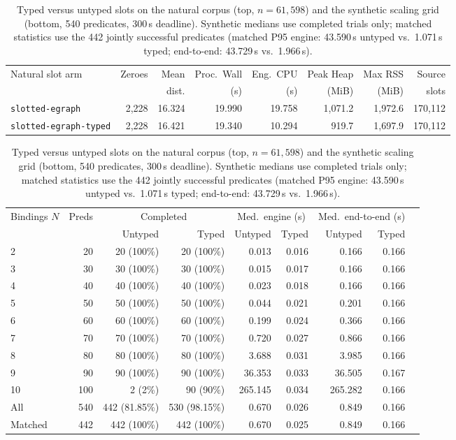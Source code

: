 \begin{table}[H]
\centering
\caption{Typed versus untyped slots on the natural corpus (top, $n=61{,}598$)
and the synthetic scaling grid (bottom, 540 predicates, 300\,s deadline).
Synthetic medians use completed trials only; matched statistics use the 442
jointly successful predicates (matched P95 engine: 43.590\,s untyped vs.\
1.071\,s typed; end-to-end: 43.729\,s vs.\ 1.966\,s).}
\label{tab:typing-ablation}
\scriptsize
\setlength{\tabcolsep}{2.5pt}
\begin{tabular}{@{}lrrrrrrr@{}}
\toprule
Natural slot arm & Zeroes & Mean & Proc.\ Wall & Eng.\ CPU & Peak Heap & Max RSS & Source\\
& & dist. & (s) & (s) & (MiB) & (MiB) & slots\\
\midrule
\texttt{slotted-egraph} & 2,228 & 16.324 & 19.990 & 19.758 & 1,071.2 & 1,972.6 & 170,112\\
\texttt{slotted-egraph-typed} & 2,228 & 16.421 & 19.340 & 10.294 & 919.7 & 1,697.9 & 170,112\\
\bottomrule
\end{tabular}

\medskip
\setlength{\tabcolsep}{2.7pt}
\begin{tabular}{@{}lrrrrrrrr@{}}
\toprule
Bindings $N$ & Preds & \multicolumn{2}{c}{Completed} & \multicolumn{2}{c}{Med.\ engine (s)} & \multicolumn{2}{c}{Med.\ end-to-end (s)}\\
\cmidrule(lr){3-4}\cmidrule(lr){5-6}\cmidrule(lr){7-8}
& & Untyped & Typed & Untyped & Typed & Untyped & Typed\\
\midrule
2 & 20 & 20 (100\%) & 20 (100\%) & 0.013 & 0.016 & 0.166 & 0.166\\
3 & 30 & 30 (100\%) & 30 (100\%) & 0.015 & 0.017 & 0.166 & 0.166\\
4 & 40 & 40 (100\%) & 40 (100\%) & 0.023 & 0.018 & 0.166 & 0.166\\
5 & 50 & 50 (100\%) & 50 (100\%) & 0.044 & 0.021 & 0.201 & 0.166\\
6 & 60 & 60 (100\%) & 60 (100\%) & 0.199 & 0.024 & 0.366 & 0.166\\
7 & 70 & 70 (100\%) & 70 (100\%) & 0.720 & 0.027 & 0.866 & 0.166\\
8 & 80 & 80 (100\%) & 80 (100\%) & 3.688 & 0.031 & 3.985 & 0.166\\
9 & 90 & 90 (100\%) & 90 (100\%) & 36.353 & 0.033 & 36.505 & 0.167\\
10 & 100 & 2 (2\%) & 90 (90\%) & 265.145 & 0.034 & 265.282 & 0.166\\
\midrule
All & 540 & 442 (81.85\%) & 530 (98.15\%) & 0.670 & 0.026 & 0.849 & 0.166\\
Matched & 442 & 442 (100\%) & 442 (100\%) & 0.670 & 0.025 & 0.849 & 0.166\\
\bottomrule
\end{tabular}
\end{table}
